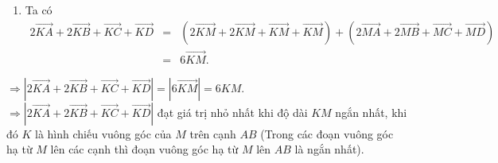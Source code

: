 \begin{bt}
{\begin{enumerate}
{
}
\item Ta có
\begin{eqnarray*}
 2\overrightarrow{KA}+2 \overrightarrow{KB}+\overrightarrow{KC}+\overrightarrow{KD}&=&\left(2\overrightarrow{KM}+2 \overrightarrow{KM}+\overrightarrow{KM}+\overrightarrow{KM}\right)+\left(2 \overrightarrow{MA}+2 \overrightarrow{MB}+\overrightarrow{MC}+\overrightarrow{MD}\right)\\
  &= & 6\overrightarrow{KM}.
 \end{eqnarray*}
\end{enumerate}
$\Rightarrow \left|2\overrightarrow{KA}+2 \overrightarrow{KB}+\overrightarrow{KC}+\overrightarrow{KD}\right|=\left|6\overrightarrow{KM} \right|=6KM$.\\
$\Rightarrow\left|2\overrightarrow{KA}+2 \overrightarrow{KB}+\overrightarrow{KC}+\overrightarrow{KD}\right|$ đạt giá trị nhỏ nhất khi độ dài $KM$ ngắn nhất, khi đó $K$ là hình chiếu vuông góc của $M$ trên cạnh $AB$ (Trong các đoạn vuông góc hạ từ $M$ lên các cạnh thì đoạn vuông góc hạ từ $M$ lên $A B$ là ngắn nhất).
}
\end{bt}

